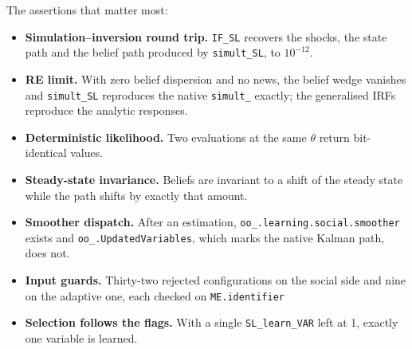 \documentclass[11pt,a4paper]{article}
\newcommand{\field}[1]{\texttt{#1}}
\begin{document}
The assertions that matter most:

\begin{itemize}[leftmargin=2em]
\item \textbf{Simulation--inversion round trip.} \texttt{IF\_SL} recovers the
      shocks, the state path and the belief path produced by
      \texttt{simult\_SL}, to $10^{-12}$.
\item \textbf{RE limit.} With zero belief dispersion and no news, the
      belief wedge vanishes and \texttt{simult\_SL} reproduces the native
      \texttt{simult\_} exactly; the generalised IRFs reproduce the analytic
      responses.
\item \textbf{Deterministic likelihood.} Two evaluations at the same $\theta$
      return bit-identical values.
\item \textbf{Steady-state invariance.} Beliefs are invariant to a shift of the
      steady state while the path shifts by exactly that amount.
\item \textbf{Smoother dispatch.} After an estimation,
      \field{oo\_.learning.social.smoother} exists and
      \field{oo\_.UpdatedVariables}, which marks the native Kalman path, does
      not.
\item \textbf{Input guards.} Thirty-two rejected configurations on the social
      side and nine on the adaptive one, each checked on
      \texttt{ME.identifier} 
\item \textbf{Selection follows the flags.} With a single
      \texttt{SL\_learn\_VAR} left at 1, exactly one variable is learned.
\end{itemize}
\end{document}
